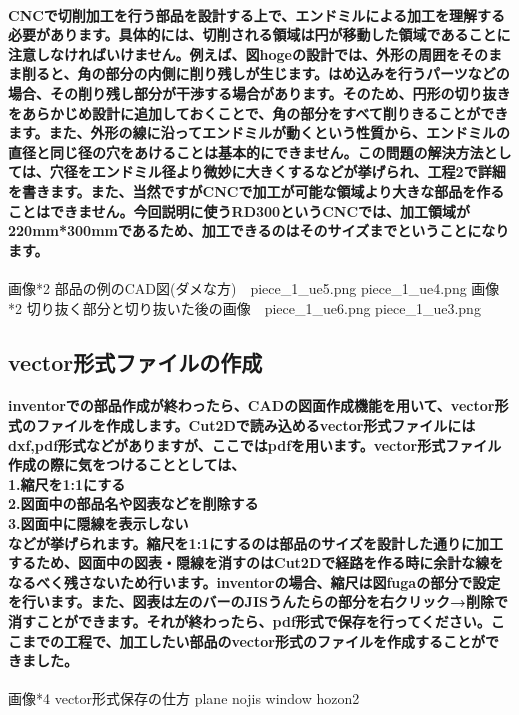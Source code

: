 \documentclass[b5paper, 9pt, twocolumn, titlepage,openany]{jsbook}%
\begin{document}
\paragraph{CNCで切削加工を行う部品を設計する上で、エンドミルによる加工を理解する必要があります。具体的には、切削される領域は円が移動した領域であることに注意しなければいけません。例えば、図hogeの設計では、外形の周囲をそのまま削ると、角の部分の内側に削り残しが生じます。はめ込みを行うパーツなどの場合、その削り残し部分が干渉する場合があります。そのため、円形の切り抜きをあらかじめ設計に追加しておくことで、角の部分をすべて削りきることができます。また、外形の線に沿ってエンドミルが動くという性質から、エンドミルの直径と同じ径の穴をあけることは基本的にできません。この問題の解決方法としては、穴径をエンドミル径より微妙に大きくするなどが挙げられ、工程2で詳細を書きます。また、当然ですがCNCで加工が可能な領域より大きな部品を作ることはできません。今回説明に使うRD300というCNCでは、加工領域が220mm*300mmであるため、加工できるのはそのサイズまでということになります。}

画像*2 部品の例のCAD図(ダメな方)　piece_1_ue5.png piece_1_ue4.png
画像*2 切り抜く部分と切り抜いた後の画像　piece_1_ue6.png piece_1_ue3.png

\subsection{vector形式ファイルの作成}
\paragraph{inventorでの部品作成が終わったら、CADの図面作成機能を用いて、vector形式のファイルを作成します。Cut2Dで読み込めるvector形式ファイルにはdxf,pdf形式などがありますが、ここではpdfを用います。vector形式ファイル作成の際に気をつけることとしては、\\
1.縮尺を1:1にする\\
2.図面中の部品名や図表などを削除する\\
3.図面中に隠線を表示しない\\
などが挙げられます。縮尺を1:1にするのは部品のサイズを設計した通りに加工するため、図面中の図表・隠線を消すのはCut2Dで経路を作る時に余計な線をなるべく残さないため行います。inventorの場合、縮尺は図fugaの部分で設定を行います。また、図表は左のバーのJISうんたらの部分を右クリック→削除で消すことができます。それが終わったら、pdf形式で保存を行ってください。ここまでの工程で、加工したい部品のvector形式のファイルを作成することができました。}

画像*4 vector形式保存の仕方 plane nojis window hozon2
\end{document}
